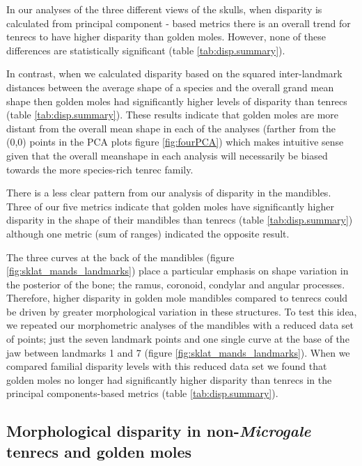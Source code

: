 \documentclass[12pt,a4paper]{article}
\begin{document}
	In our analyses of the three different views of the skulls, when disparity is calculated from principal component - based metrics there is an overall trend for tenrecs to have higher disparity than golden moles. However, none of these differences are statistically significant (table \ref{tab:disp.summary}). 
	
	In contrast, when we calculated disparity based on the squared inter-landmark distances between the average shape of a species and the overall grand mean shape \citep{Zelditch2012} then golden moles had significantly higher levels of disparity than tenrecs (table \ref{tab:disp.summary}). These results indicate that golden moles are more distant from the overall mean shape in each of the analyses (farther from the (0,0) points in the PCA plots figure \ref{fig:fourPCA}) which makes intuitive sense given that the overall meanshape in each analysis will necessarily be biased towards the more species-rich tenrec family. 
	
	
	There is a less clear pattern from our analysis of disparity in the mandibles. Three of our five metrics indicate that golden moles have significantly higher disparity in the shape of their mandibles than tenrecs (table \ref{tab:disp.summary}) although one metric (sum of ranges) indicated the opposite result. 
	
	The three curves at the back of the mandibles (figure \ref{fig:sklat_mands_landmarks}) place a particular emphasis on shape variation in the posterior of the bone; the ramus, coronoid, condylar and angular processes. Therefore, higher disparity in golden mole mandibles compared to tenrecs could be driven by greater morphological variation in these structures. To test this idea, we repeated our morphometric analyses of the mandibles with a reduced data set of points; just the seven landmark points and one single curve at the base of the jaw between landmarks 1 and 7 (figure \ref{fig:sklat_mands_landmarks}). When we compared familial disparity levels with this reduced data set we found that golden moles no longer had significantly higher disparity than tenrecs in the principal components-based metrics (table \ref{tab:disp.summary}).
	
\subsection{Morphological disparity in non-\textit{Microgale} tenrecs and golden moles} 	   
	
\end{document}
